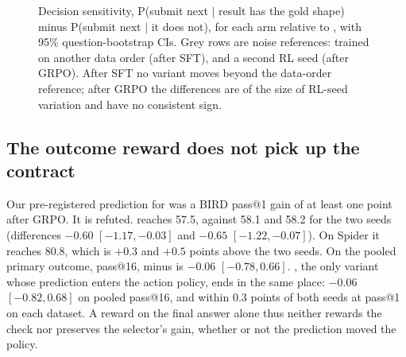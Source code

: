 \begin{table}[t]
\centering\small
{}
\caption{Decision-point intervention (first decision point; 3,882--6,115 decision points per row, four continuations per condition). Shape-driven asymmetry: P(submit) after a result that matches the agent's own contract minus after one that does not, on the unchanged continuations. Contract flips / check flips: P(submit) when the contract, or a forced check sentence, says ``matches'' minus when it says ``does not match'', for the same result; all 95\% question-bootstrap CIs lie within $[-0.003, 0.011]$. No contract: P(submit) without contract and check, minus with them.}
\label{tab:intervention}
\end{table}

\begin{figure}[t]
\centering
{}
\caption{Decision sensitivity, P(submit next $\mid$ result has the gold shape) minus P(submit next $\mid$ it does not), for each arm relative to \armA{}, with 95\% question-bootstrap CIs. Grey rows are noise references: \armA{} trained on another data order (after SFT), and a second RL seed (after GRPO). After SFT no variant moves beyond the data-order reference; after GRPO the differences are of the size of RL-seed variation and have no consistent sign.}
\label{fig:decisions}
\end{figure}

\subsection{The outcome reward does not pick up the contract}
\label{sec:e3rl}
Our pre-registered prediction for \armG{} was a BIRD pass@1 gain of at least one point after GRPO. It is refuted. \armG{} reaches 57.5, against 58.1 and 58.2 for the two \armA{} seeds (differences $-0.60$ $[-1.17,-0.03]$ and $-0.65$ $[-1.22,-0.07]$). On Spider it reaches 80.8, which is $+0.3$ and $+0.5$ points above the two seeds. On the pooled primary outcome, pass@16, \armG{} minus \armA{} is $-0.06$ $[-0.78, 0.66]$. \armF{}, the only variant whose prediction enters the action policy, ends in the same place: $-0.06$ $[-0.82, 0.68]$ on pooled pass@16, and within 0.3 points of both \armA{} seeds at pass@1 on each dataset. A reward on the final answer alone thus neither rewards the check nor preserves the selector's gain, whether or not the prediction moved the policy.
